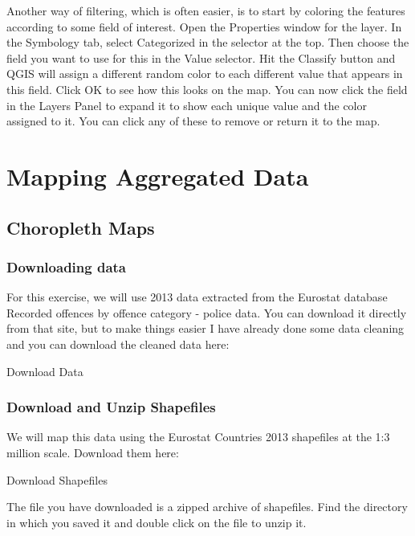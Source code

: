 \documentclass[]{book}
\begin{document}
Another way of filtering, which is often easier, is to start by coloring the features according to some field of interest. Open the Properties window for the layer. In the Symbology tab, select Categorized in the selector at the top. Then choose the field you want to use for this in the Value selector. Hit the Classify button and QGIS will assign a different random color to each different value that appears in this field. Click OK to see how this looks on the map. You can now click the field in the Layers Panel to expand it to show each unique value and the color assigned to it. You can click any of these to remove or return it to the map.

\hypertarget{aggregated-data}{%
\chapter{Mapping Aggregated Data}\label{aggregated-data}}

\hypertarget{choropleth-maps}{%
\section{Choropleth Maps}\label{choropleth-maps}}

\hypertarget{downloading-data-1}{%
\subsection{Downloading data}\label{downloading-data-1}}

For this exercise, we will use 2013 data extracted from the Eurostat database Recorded offences by offence category - police data. You can download it directly from that site, but to make things easier I have already done some data cleaning and you can download the cleaned data here:

Download Data

\hypertarget{download-and-unzip-shapefiles}{%
\subsection{Download and Unzip Shapefiles}\label{download-and-unzip-shapefiles}}

We will map this data using the Eurostat Countries 2013 shapefiles at the 1:3 million scale. Download them here:

Download Shapefiles

The file you have downloaded is a zipped archive of shapefiles. Find the directory in which you saved it and double click on the file to unzip it.
\end{document}
